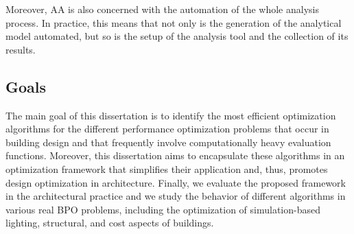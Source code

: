 	Moreover, \ac{AA} is also concerned with the automation of the whole analysis process. In practice, this means that not only is the generation of the analytical model automated, but so is the setup of the analysis tool and the collection of its results.
	
	
		



	
\subsection{Goals}

The main goal of this dissertation is to identify the most efficient optimization algorithms for the different performance optimization problems that occur in building design and that frequently involve computationally heavy evaluation functions. Moreover, this dissertation aims to encapsulate these algorithms in an optimization framework that simplifies their application and, thus, promotes design optimization in architecture. Finally, we evaluate the proposed framework in the architectural practice and we study the behavior of different algorithms in various real \ac{BPO} problems, including the optimization of simulation-based lighting, structural, and cost aspects of buildings. 